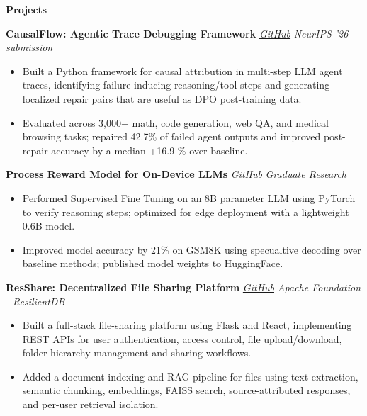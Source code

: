 \documentclass[11pt]{article}
\begin{document}
\noindent\textbf{Projects}
\vspace{-6pt}

\noindent\textbf{CausalFlow: Agentic Trace Debugging Framework} \hfill \href{https://github.com/devangb3/CausalFlow}{\textit{GitHub}} \textbar{} \textit{NeurIPS '26 submission}
\vspace{-6pt}
\begin{itemize}[leftmargin=0.45in, topsep=2pt, itemsep=-5pt]
\item Built a Python framework for causal attribution in multi-step LLM agent traces, identifying failure-inducing reasoning/tool steps and generating localized repair pairs that are useful as DPO post-training data.
\item Evaluated across 3,000+ math, code generation, web QA, and medical browsing tasks; repaired 42.7\% of failed agent outputs and improved post-repair accuracy by a median +16.9 \% over baseline.
\end{itemize}

\vspace{2pt}
\noindent\textbf{Process Reward Model for On-Device LLMs} \hfill \href{https://github.com/devangb3/Process-Reward-Models}{\textit{GitHub}} \textbar{} \textit{Graduate Research}
\vspace{-6pt}
\begin{itemize}[leftmargin=0.45in, topsep=2pt, itemsep=-5pt]
\item Performed Supervised Fine Tuning on an 8B parameter LLM using PyTorch to verify reasoning steps; optimized for edge deployment with a lightweight 0.6B model.
\item Improved model accuracy by 21\% on GSM8K using specualtive decoding over baseline methods; published model weights to HuggingFace.
\end{itemize}
\vspace{-6pt}
\noindent\textbf{ResShare: Decentralized File Sharing Platform} \hfill \href{https://github.com/ResilientApp/ResShareDeployable}{\textit{GitHub}} \textbar{} \textit{Apache Foundation - ResilientDB}
\vspace{-6pt}
\begin{itemize}[leftmargin=0.45in, topsep=2pt, itemsep=-5pt]
\item Built a full-stack file-sharing platform using Flask and React, implementing REST APIs for user authentication, access control, file upload/download, folder hierarchy management and sharing workflows.
\item Added a document indexing and RAG pipeline for files using text extraction, semantic chunking, embeddings, FAISS search, source-attributed responses, and per-user retrieval isolation.
\end{itemize}
\end{document}
